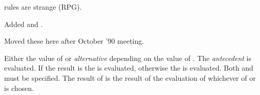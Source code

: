 %
\begin{optPrivate}
     rules are strange (RPG).

    Added  and .

    Moved these here after October '90 meeting.
\end{optPrivate}
%
\begin{optDefinition}
%
%
\Syntax
{}%
%
\result%
Either the value of  or {\em alternative\/} depending on the
value of .
%
\remarks%
The {\em antecedent\/} is evaluated.  If the result is \true{} the
 is evaluated, otherwise the  is evaluated.  Both
 and  must be specified.  The result of
 is the result of the evaluation of whichever of 
or  is chosen.


\end{optDefinition}
